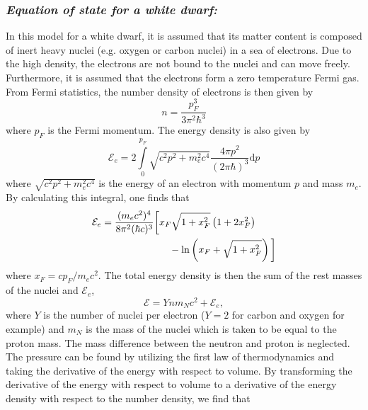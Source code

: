 \documentclass[twocolumn]{article}
\begin{document}
\begin{large}
\subsubsection*{\textit{Equation of state for a white dwarf:}}
In this model for a white dwarf, it is assumed that its matter content is composed of inert heavy nuclei (e.g. oxygen or carbon nuclei) in a sea of electrons. Due to the high density, the electrons are not bound to the nuclei and can move freely. Furthermore, it is assumed that the electrons form a zero temperature Fermi gas. From Fermi statistics, the number density of electrons is then given by
\begin{equation}
    n = \frac{p_F^3}{3\pi^2\hbar^3}
\end{equation}
where $p_F$ is the Fermi momentum. The energy density is also given by 
\begin{equation}
    \mathcal{E}_e = 2\int\limits_0^{p_F}\sqrt{c^2p^2+m_e^2c^4}\frac{4\pi p^2}{(2\pi\hbar)^3}\text{d}p
\end{equation}
where $\sqrt{c^2p^2+m_e^2c^4}$ is the energy of an electron with momentum $p$ and mass $m_e$. By calculating this integral, one finds that 
\begin{equation}
    \begin{split}
        &\mathcal{E}_e = \frac{(m_ec^2)^4}{8\pi^2(\hbar c)^3}\bigg[x_F\sqrt{1+x_F^2}\left(1+2x_F^2\right) \\ 
        &\hspace{2.75cm}-\ln\left(x_F+\sqrt{1+x_F^2}\right)\bigg] \\ 
    \end{split}
\end{equation}
where $x_F = cp_F/m_ec^2$. The total energy density is then the sum of the rest masses of the nuclei and $\mathcal{E}_e$,
\begin{equation}
    \mathcal{E} = Ynm_Nc^2 + \mathcal{E}_e,
\end{equation}
where $Y$ is the number of nuclei per electron ($Y=2$ for carbon and oxygen for example) and $m_N$ is the mass of the nuclei which is taken to be equal to the proton mass. The mass difference between the neutron and proton is neglected. The pressure can be found by utilizing the first law of thermodynamics and taking the derivative of the energy with respect to volume. By transforming the derivative of the energy with respect to volume to a derivative of the energy density with respect to the number density, we find that
\begin{equation}
    \begin{split}

\end{split}
\end{equation}
\end{large}
\end{document}
